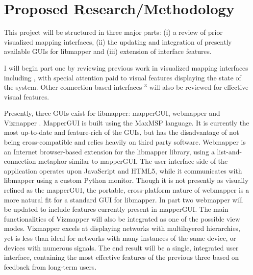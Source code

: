 \documentclass[11pt]{article}
\begin{document}
\section*{Proposed Research/Methodology}

 This project will be structured in three major parts: (i) a review of prior visualized mapping interfaces, (ii) the updating and integration of presently available GUIs for libmapper and (iii) extension of interface features. %

I will begin part one by reviewing previous work in visualized mapping interfaces including \cite{vizmapper, inclusiveInterconnections, junxion}, with special attention paid to visual features displaying the state of the system. Other connection-based interfaces \cite{integra, jamoma}$^3$ will also be reviewed for effective visual features.

Presently, three GUIs exist for libmapper: mapperGUI, webmapper and Vizmapper \cite{vizmapper}. MapperGUI is built using the MaxMSP language. It is currently the most up-to-date and feature-rich of the GUIs, but has the disadvantage of not being cross-compatible and relies heavily on third party software.
 Webmapper is an Internet browser-based extension for the libmapper library, using a list-and-connection metaphor similar to mapperGUI. The user-interface side of the application operates upon JavaScript and HTML5, while it communicates with libmapper using a custom Python monitor. Though it is not presently as visually refined as the mapperGUI, the portable, cross-platform nature of webmapper is a more natural fit for a standard GUI for libmapper. In part two webmapper will be updated to include features currently present in mapperGUI. The main functionalities of Vizmapper will also be integrated %
  as one of the possible view modes. Vizmapper excels at displaying networks with multilayered hierarchies, yet is less than ideal for networks with many instances of the same device, or devices with numerous signals. 
   The end result will be a single, integrated user interface, containing the most effective features of the previous three based on feedback from long-term users.
  
\end{document}
